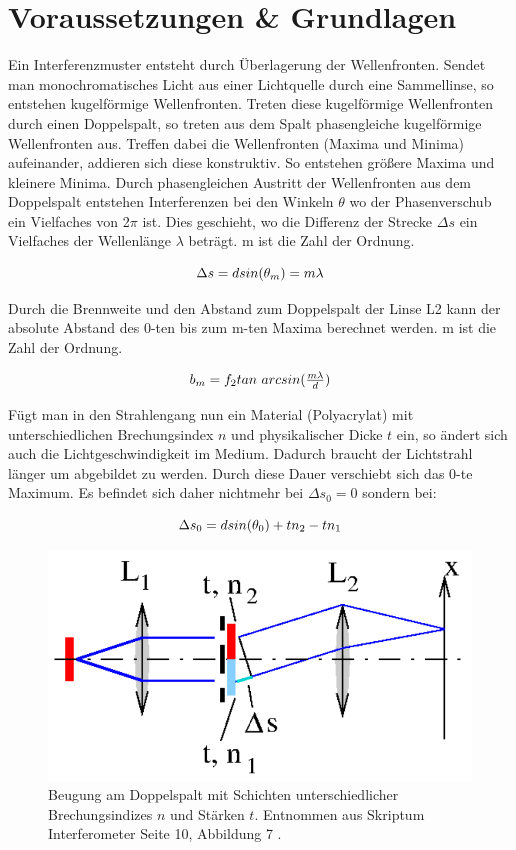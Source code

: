 \documentclass[12pt,a4paper,twoside]{article}
\begin{document}
\section{Voraussetzungen \& Grundlagen} %
Ein Interferenzmuster entsteht durch Überlagerung der Wellenfronten. Sendet man monochromatisches Licht aus einer Lichtquelle durch eine Sammellinse, so entstehen kugelförmige Wellenfronten. 
Treten diese kugelförmige Wellenfronten durch einen Doppelspalt, so treten aus dem Spalt phasengleiche kugelförmige Wellenfronten aus. 
Treffen dabei die Wellenfronten (Maxima und Minima) aufeinander, addieren sich diese konstruktiv. So entstehen größere Maxima und kleinere Minima. 
Durch phasengleichen Austritt der Wellenfronten aus dem Doppelspalt entstehen Interferenzen bei den Winkeln $\theta$ wo der Phasenverschub ein Vielfaches von 2$\pi$ ist. 
Dies geschieht, wo die Differenz der Strecke $\Delta s$ ein Vielfaches der Wellenlänge $\lambda$ beträgt. m ist die Zahl der Ordnung. 

\begin{equation}
    \label{eq:beugung am doppelspalt}
    \centerline{$\Delta s = dsin(\theta_m) = m\lambda$}
\end{equation}

\noindent
Durch die Brennweite und den Abstand zum Doppelspalt der Linse L2 kann der absolute Abstand des 0-ten bis zum m-ten Maxima berechnet werden. m ist die Zahl der Ordnung. 

\begin{equation}
    \label{eq:grundlagen 2}
    \centerline{$b_m = f_2 tan$ $arcsin(\frac{m \lambda}{d})$}
\end{equation}

\noindent
Fügt man in den Strahlengang nun ein Material (Polyacrylat) mit unterschiedlichen Brechungsindex $n$ und physikalischer Dicke $t$ ein, so ändert sich auch die Lichtgeschwindigkeit im Medium. 
Dadurch braucht der Lichtstrahl länger um abgebildet zu werden. Durch diese Dauer verschiebt sich das 0-te Maximum. Es befindet sich daher nichtmehr bei $\Delta s_0 = 0$ sondern bei: 

\begin{equation}
    \label{eq:verschiebung}
    \centerline{$\Delta s_0 = d sin(\theta_0) + tn_2 - tn_1$}
\end{equation}

\begin{figure}[H]
    \centering
    \includegraphics[width=0.6\linewidth]{nudes/verschiebung.png}
    \caption{Beugung am Doppelspalt mit Schichten unterschiedlicher Brechungsindizes $n$ und Stärken $t$. Entnommen aus Skriptum Interferometer Seite 10, Abbildung 7 \cite{teachcenter2}. }
    \label{fig:verschiebung}
\end{figure}
\end{document}

